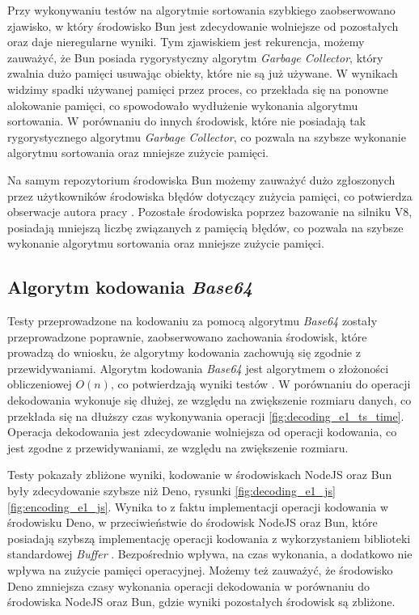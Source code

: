 Przy wykonywaniu testów na algorytmie sortowania szybkiego zaobserwowano zjawisko, w który środowisko Bun jest zdecydowanie wolniejsze od pozostałych oraz daje nieregularne wyniki. Tym zjawiskiem jest rekurencja, możemy zauważyć, że Bun posiada rygorystyczny algorytm \textit{Garbage Collector}, który zwalnia dużo pamięci usuwając obiekty, które nie są już używane. W wynikach widzimy spadki używanej pamięci przez proces, co przekłada się na ponowne alokowanie pamięci, co spowodowało wydłużenie wykonania algorytmu sortowania. W porównaniu do innych środowisk, które nie posiadają tak rygorystycznego algorytmu \textit{Garbage Collector}, co pozwala na szybsze wykonanie algorytmu sortowania oraz mniejsze zużycie pamięci. 

Na samym repozytorium środowiska Bun możemy zauważyć dużo zgłoszonych przez użytkowników środowiska błędów dotyczący zużycia pamięci, co potwierdza obserwacje autora pracy \cite{bun_memory}. Pozostałe środowiska poprzez bazowanie na silniku V8, posiadają mniejszą liczbę związanych z pamięcią błędów, co pozwala na szybsze wykonanie algorytmu sortowania oraz mniejsze zużycie pamięci.

\subsection{Algorytm kodowania \textit{Base64}}
Testy przeprowadzone na kodowaniu za pomocą algorytmu \textit{Base64} zostały przeprowadzone poprawnie, zaobserwowano zachowania środowisk, które prowadzą do wniosku, że algorytmy kodowania zachowują się zgodnie z przewidywaniami. Algorytm kodowania \textit{Base64} jest algorytmem o złożoności obliczeniowej $O(n)$, co potwierdzają wyniki testów \cite{cryptoeprint:2022/361}. W porównaniu do operacji dekodowania wykonuje się dłużej, ze względu na zwiększenie rozmiaru danych, co przekłada się na dłuższy czas wykonywania operacji \ref{fig:decoding_e1_ts_time}. Operacja dekodowania jest zdecydowanie wolniejsza od operacji kodowania, co jest zgodne z przewidywaniami, ze względu na zwiększenie rozmiaru.

Testy pokazały zbliżone wyniki, kodowanie w środowiskach NodeJS oraz Bun były zdecydowanie szybsze niż Deno, rysunki \ref{fig:decoding_e1_js} \ref{fig:encoding_e1_js}. Wynika to z faktu implementacji operacji kodowania w środowisku Deno, w przeciwieństwie do środowisk NodeJS oraz Bun, które posiadają szybszą implementację operacji kodowania z wykorzystaniem biblioteki standardowej \textit{Buffer} \cite{buffer}. Bezpośrednio wpływa, na czas wykonania, a dodatkowo nie wpływa na zużycie pamięci operacyjnej. Możemy też zauważyć, że środowisko Deno zmniejsza czasy wykonania operacji dekodowania w porównaniu do środowiska NodeJS oraz Bun, gdzie wyniki pozostałych środowisk są zbliżone.

